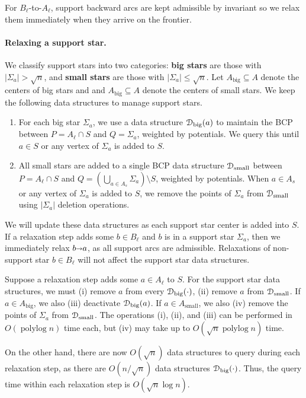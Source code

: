 \documentclass[11pt]{article}
\def\polylog{\mathop{\mathrm{polylog}}}
\def\abs#1{\mathopen| #1 \mathclose|}		%
\def\arcto{\mathord\shortrightarrow}
\def\arc#1#2{#1\arcto#2}
\theoremstyle{plain}
\numberwithin{figure}{section}
\def\EMPH#1{\textbf{\boldmath #1}}
\begin{document}
For $B_\ell$-to-$A_\ell$, support backward arcs are kept admissible by invariant
so we relax them immediately when they arrive on the frontier.

\paragraph{Relaxing a support star.}
We classify support stars into two categories: \EMPH{big stars} are those with
$\abs{\Sigma_a} > \sqrt{n}$, and \EMPH{small stars} are those with
$\abs{\Sigma_a} \leq \sqrt{n}$.
Let $A_\text{big} \subseteq A$ denote the centers of big stars and
and $A_\text{big} \subseteq A$ denote the centers of small stars.
We keep the following data structures to manage support stars.
\begin{enumerate}
\item For each big star $\Sigma_a$, we use a data structure
	$\EuScript{D}_\text{big}(a)$ to maintain the BCP between
	$P = A_\ell \cap S$ and $Q = \Sigma_a$, weighted by potentials.
	We query this until $a \in S$ or any vertex of $\Sigma_a$ is added to
	$S$.
\item All small stars are added to a single BCP data structure
	$\EuScript{D}_\text{small}$ between $P = A_\ell \cap S$ and
	$Q = (\bigcup_{a \in A_s} \Sigma_a) \setminus S$, weighted by
	potentials.
	When $a \in A_s$ or any vertex of $\Sigma_a$ is added to $S$,
	we remove the points of $\Sigma_a$ from $\EuScript{D}_\text{small}$
	using $\abs{\Sigma_a}$ deletion operations.
\end{enumerate}
We will update these data structures as each support star center is added into
$S$.
If a relaxation step adds some $b \in B_\ell$ and $b$ is in a support star
$\Sigma_a$, then we immediately relax $\arc ba$, as all support arcs are
admissible.
Relaxations of non-support star $b \in B_\ell$ will not affect the support star
data structures.

Suppose a relaxation step adds some $a \in A_\ell$ to $S$.
For the support star data structures, we must
(i) remove $a$ from every $\EuScript{D}_\text{big}(\cdot)$,
(ii) remove $a$ from $\EuScript{D}_\text{small}$.
If $a \in A_\text{big}$, we also (iii) deactivate $\EuScript{D}_\text{big}(a)$.
If $a \in  A_\text{small}$, we also (iv) remove the points of $\Sigma_a$ from
$\EuScript{D}_\text{small}$.
The operations (i), (ii), and (iii) can be performed in $O(\polylog n)$ time
each, but (iv) may take up to $O(\sqrt{n}\polylog n)$ time.

On the other hand, there are now $O(\sqrt{n})$ data structures to query during
each relaxation step, as there are $O(n/\sqrt{n})$ data structures
$\EuScript{D}_\text{big}(\cdot)$.
Thus, the query time within each relaxation step is $O(\sqrt{n}\log n)$.
\end{document}
